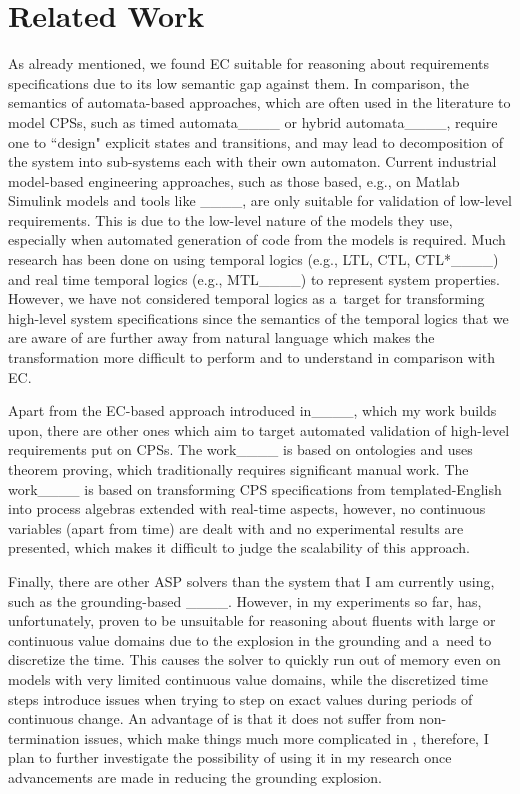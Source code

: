 \section{Related Work}

As already mentioned, we found EC suitable for reasoning about requirements specifications due to its low semantic gap against them.
%
In comparison, the semantics of automata-based approaches, which are often used in the literature to model CPSs, such as timed automata____ or hybrid automata____, require one to ``design" explicit states and transitions, and may lead to decomposition of the system into sub-systems each with their own automaton.
%
Current industrial model-based engineering approaches, such as those based, e.g., on Matlab Simulink models and tools like \hilite{}____, are only suitable for validation of low-level requirements.
%
This is due to the low-level nature of the models they use, especially when automated generation of code from the models is required.
%
Much research has been done on using temporal logics (e.g., LTL, CTL, CTL*____) and real time temporal logics (e.g., MTL____) to represent system properties.
%
However, we have not considered temporal logics as a~target for transforming high-level system specifications since the semantics of the temporal logics that we are aware of are further away from natural language which makes the transformation more difficult to perform and to understand in comparison with EC.

Apart from the EC-based approach introduced in____, which my work builds upon, 
there are other ones which aim to target automated validation of high-level requirements put on CPSs.
%
The work____ is based on ontologies and uses theorem proving, which traditionally requires significant manual work.
%
The work____ is based on transforming CPS specifications from templated-English
%
into process algebras extended with real-time aspects, however, no continuous variables (apart from time) are dealt with and no experimental results are presented, which makes it difficult to judge the scalability of this approach.

Finally, there are other ASP solvers than the \scasp{} system that I am currently using, such as the grounding-based \clingo{}____.
%
However, in my experiments so far, \clingo{} has, unfortunately, proven to be unsuitable for reasoning about fluents with large or continuous value domains due to the explosion in the grounding and a~need to discretize the time.
%
This causes the solver to quickly run out of memory even on models with very limited continuous value domains, while the discretized time steps introduce issues when trying to step on exact values during periods of continuous change.
%
An advantage of \clingo{} is that it does not suffer from non-termination issues, which make things much more complicated in \scasp{}, therefore, I plan to further investigate the possibility of using it in my research once advancements are made in reducing the grounding explosion.




